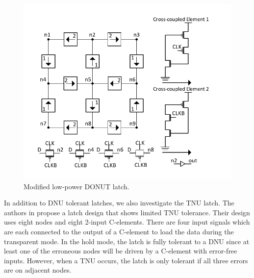\begin{figure}[!htbp]
	\centering
	\includegraphics[width=\linewidth]{Figures/ModDONUT}
	\caption{Modified low-power DONUT latch.}
	\label{DONUT_M}
\end{figure}

In addition to DNU tolerant latches, we also investigate the TNU latch. The authors in \cite{Blum2007} propose a latch design that shows limited TNU tolerance. Their design uses eight nodes and eight 2-input C-elements. There are four input signals which are each connected to the output of a C-element to load the data during the transparent mode. In the hold mode, the latch is fully tolerant to a DNU since at least one of the erroneous nodes will be driven by a C-element with error-free inputs. However, when a TNU occurs, the latch is only tolerant if all three errors are on adjacent nodes. 